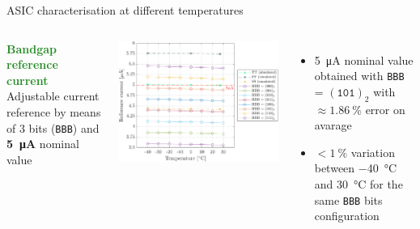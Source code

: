 \documentclass[aspectratio=169,xcolor=dvipsnames,handout]{beamer} %
\newcommand{\greencheck}{{\color{ForestGreen}\checkmark}}
\begin{document}
\begin{frame}{ASIC characterisation at different temperatures}
\begin{columns}[T]
        \addtolength{\leftmargini}{\labelsep}
        \vskip0.3cm
        \fontsize{9pt}{1}\selectfont
        \textbf{\textcolor{ForestGreen}{Bandgap reference current}}\\
        \vskip0.15cm
        \fontsize{8.5pt}{1}\selectfont
        Adjustable current reference by means of 3 bits (\texttt{BBB}) and \textbf{\SI{5}{\micro\ampere}} nominal value
        \vskip-0.4cm
        \begin{center}
            \includegraphics[height=0.5\textheight]{images/temperature_effects/BGR_current_Xtemp_all-BBB.pdf}
        \end{center}
        \vskip-0.2cm
        \begin{itemize}
            \item \SI{5}{\micro\ampere} nominal value obtained with \texttt{BBB} = $(\texttt{101})_{2}$ with \textbf{$\approx\SI{1.86}{\percent}$} error on avarage \greencheck 
            \item \textbf{$< \SI{1}{\percent}$} variation between \SI{-40}{\celsius} and \SI{30}{\celsius} for the same \texttt{BBB} bits configuration \greencheck
        \end{itemize}
    \end{columns}
\end{frame}


\end{document}
